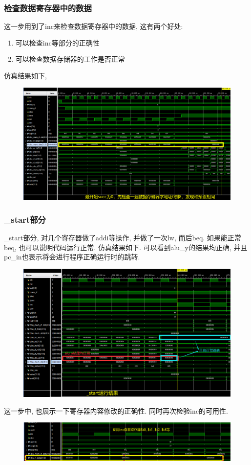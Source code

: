 \documentclass[UTF8]{article}
\begin{document}
\subsubsection{检查数据寄存器中的数据}
这一步用到了inc来检查数据寄存器中的数据, 这有两个好处:
\begin{enumerate}
	\item 可以检查inc等部分的正确性
	\item 可以检查数据存储器的工作是否正常
\end{enumerate}
仿真结果如下,
\begin{figure}[H]
	\centering
	\includegraphics[width=\linewidth]{mem_data.png}
\end{figure}
\subsubsection{\_start部分}
\_start部分, 对几个寄存器做了addi等操作, 并做了一次lw, 而后beq. 如果能正常beq, 也可以说明代码运行正常.
仿真结果如下. 可以看到alu\_y的结果均正确, 并且pc\_in也表示将会进行程序正确运行时的跳转.
\begin{figure}[H]
	\centering
	\includegraphics[width=\linewidth]{_start.png}
\end{figure}
这一步中, 也展示一下寄存器内容修改的正确性. 同时再次检验inc的可用性.
\begin{figure}[H]
	\centering
	\includegraphics[width=\linewidth]{_start_data.png}
\end{figure}
\end{document}

